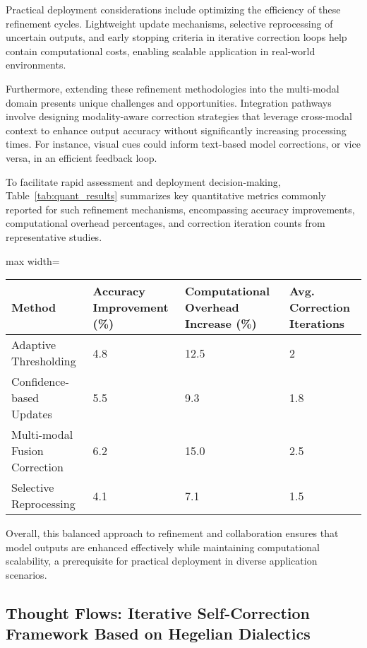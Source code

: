 \documentclass[sigconf]{acmart}
\begin{document}
Practical deployment considerations include optimizing the efficiency of these refinement cycles. Lightweight update mechanisms, selective reprocessing of uncertain outputs, and early stopping criteria in iterative correction loops help contain computational costs, enabling scalable application in real-world environments.

Furthermore, extending these refinement methodologies into the multi-modal domain presents unique challenges and opportunities. Integration pathways involve designing modality-aware correction strategies that leverage cross-modal context to enhance output accuracy without significantly increasing processing times. For instance, visual cues could inform text-based model corrections, or vice versa, in an efficient feedback loop.

To facilitate rapid assessment and deployment decision-making, Table~\ref{tab:quant_results} summarizes key quantitative metrics commonly reported for such refinement mechanisms, encompassing accuracy improvements, computational overhead percentages, and correction iteration counts from representative studies.

\begin{table*}[htbp]
\centering
\caption{Summary of Key Quantitative Results on Model Output Refinement Efficiency and Performance}
\label{tab:quant_results}
\begin{adjustbox}{max width=\textwidth}
\begin{tabular}{@{}llll@{}}
\toprule
\textbf{Method} & \textbf{Accuracy Improvement (\%)} & \textbf{Computational Overhead Increase (\%)} & \textbf{Avg. Correction Iterations} \\ \midrule
Adaptive Thresholding & 4.8 & 12.5 & 2 \\
Confidence-based Updates & 5.5 & 9.3 & 1.8 \\
Multi-modal Fusion Correction & 6.2 & 15.0 & 2.5 \\
Selective Reprocessing & 4.1 & 7.1 & 1.5 \\ \bottomrule
\end{tabular}
\end{adjustbox}
\end{table*}

Overall, this balanced approach to refinement and collaboration ensures that model outputs are enhanced effectively while maintaining computational scalability, a prerequisite for practical deployment in diverse application scenarios.

\subsection{Thought Flows: Iterative Self-Correction Framework Based on Hegelian Dialectics}
\end{document}
